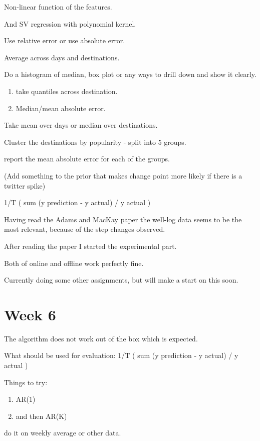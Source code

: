 \documentclass[11pt]{amsart}
\begin{document}
Non-linear function of the features.

And SV regression with polynomial kernel.

Use relative error or use absolute error.

Average across days and destinations. 

Do a histogram of median, box plot or any ways to drill down and show it clearly.
\begin{enumerate}
\item take quantiles across destination. 
\item Median/mean absolute error.
\end{enumerate}

Take mean over days or median over destinations.

Cluster the destinations by popularity - split into 5 groups.

report the mean absolute error for each of the groups.

(Add something to the prior that makes change point more likely if there is a twitter spike)

1/T ( sum (y prediction - y actual) / y actual )


Having read the Adams and MacKay paper the well-log data seems to be the most relevant, because of the step changes observed.

After reading the paper I started the experimental part. 

Both of online and offline work perfectly fine.

Currently doing some other assignments, but will make a start on this soon.

\section{Week 6}

The algorithm does not work out of the box which is expected. 

What should be used for evaluation: 1/T ( sum (y prediction - y actual) / y actual )

Things to try:

\begin{enumerate}
\item AR(1)
\item and then AR(K)
\end{enumerate}

do it on weekly average or other data.
\end{document}

